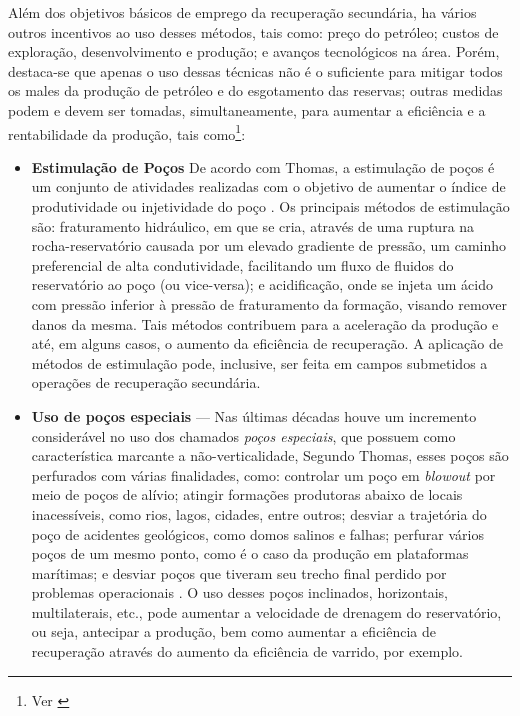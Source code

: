 Al\'{e}m dos objetivos b\'{a}sicos de emprego da recupera\c{c}\~{a}o secund\'{a}ria, ha v\'{a}rios outros incentivos ao uso desses m\'{e}todos, tais como: pre\c{c}o do petr\'{o}leo; custos de explora\c{c}\~{a}o, desenvolvimento e produ\c{c}\~{a}o; e avan\c{c}os tecnol\'{o}gicos na \'{a}rea. Por\'{e}m, destaca-se que apenas o uso dessas t\'{e}cnicas n\~{a}o \'{e} o suficiente para mitigar todos os males da produ\c{c}\~{a}o de petr\'{o}leo e do esgotamento das reservas; outras medidas podem e devem ser tomadas, simultaneamente, para aumentar a efici\^{e}ncia e a rentabilidade da produ\c{c}\~{a}o, tais como\footnote{Ver \cite{engres}}:
\begin{itemize}
\item \textbf{Estimula\c{c}\~{a}o de Po\c{c}os} De acordo com Thomas, a estimula\c{c}\~{a}o de po\c{c}os \'{e} um conjunto de atividades realizadas com o objetivo de aumentar o \'{i}ndice de produtividade ou injetividade do po\c{c}o \cite[p.~166]{engpetro}. Os principais m\'{e}todos de estimula\c{c}\~{a}o s\~{a}o: fraturamento hidr\'{a}ulico, em que se cria, atrav\'{e}s de uma ruptura na rocha-reservat\'{o}rio causada por um elevado gradiente de press\~{a}o, um caminho preferencial de alta condutividade, facilitando um fluxo de fluidos do reservat\'{o}rio ao po\c{c}o (ou vice-versa); e acidifica\c{c}\~{a}o, onde se injeta um \'{a}cido com press\~{a}o inferior \`{a} press\~{a}o de fraturamento da forma\c{c}\~{a}o, visando remover danos da mesma. Tais m\'{e}todos contribuem para a acelera\c{c}\~{a}o da produ\c{c}\~{a}o e at\'{e}, em alguns casos, o aumento da efici\^{e}ncia de recupera\c{c}\~{a}o. A aplica\c{c}\~{a}o de m\'{e}todos de estimula\c{c}\~{a}o pode, inclusive, ser feita em campos submetidos a opera\c{c}\~{o}es de recupera\c{c}\~{a}o secund\'{a}ria.
\item \textbf{Uso de po\c{c}os especiais} --- Nas \'{u}ltimas d\'{e}cadas houve um incremento consider\'{a}vel no uso dos chamados \textit{po\c{c}os especiais}, que possuem como caracter\'{i}stica marcante a n\~{a}o-verticalidade, Segundo Thomas, esses po\c{c}os s\~{a}o perfurados com v\'{a}rias finalidades, como: controlar um po\c{c}o em \textit{blowout} por meio de po\c{c}os de al\'{i}vio; atingir forma\c{c}\~{o}es produtoras abaixo de locais inacess\'{i}veis, como rios, lagos, cidades, entre outros; desviar a trajet\'{o}ria do po\c{c}o de acidentes geol\'{o}gicos, como domos salinos e falhas; perfurar v\'{a}rios po\c{c}os de um mesmo ponto, como \'{e} o caso da produ\c{c}\~{a}o em plataformas mar\'{i}timas; e desviar po\c{c}os que tiveram seu trecho final perdido por problemas operacionais \cite[p. 106]{engpetro}. O uso desses po\c{c}os inclinados, horizontais, multilaterais, etc., pode aumentar a velocidade de drenagem do reservat\'{o}rio, ou seja, antecipar a produ\c{c}\~{a}o, bem como aumentar a efici\^{e}ncia de recupera\c{c}\~{a}o atrav\'{e}s do aumento da efici\^{e}ncia de varrido, por exemplo.

\end{itemize}
